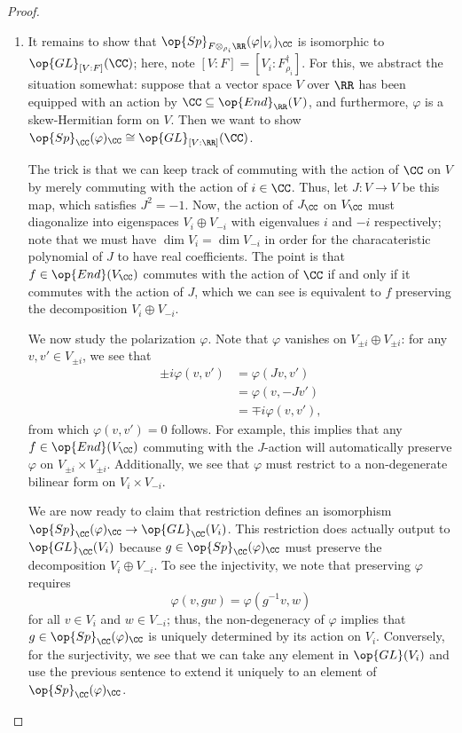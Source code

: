 \documentclass[../thesis.tex]{subfiles}
\begin{document}
\begin{proof}
\begin{enumerate}
		\item It remains to show that $\op{Sp}_{F\otimes_{\rho_i}\RR}(\varphi|_{V_i})_\CC$ is isomorphic to $\op{GL}_{[V:F]}(\CC)$; here, note $[V:F]=[V_i:F_{\rho_i}^\dagger]$. For this, we abstract the situation somewhat: suppose that a vector space $V$ over $\RR$ has been equipped with an action by $\CC\subseteq\op{End}_{\RR}(V)$, and furthermore, $\varphi$ is a skew-Hermitian form on $V$. Then we want to show $\op{Sp}_{\CC}(\varphi)_\CC\cong\op{GL}_{[V:\RR]}(\CC)$. 

		The trick is that we can keep track of commuting with the action of $\CC$ on $V$ by merely commuting with the action of $i\in\CC$. Thus, let $J\colon V\to V$ be this map, which satisfies $J^2=-1$. Now, the action of $J_\CC$ on $V_\CC$ must diagonalize into eigenspaces $V_i\oplus V_{-i}$ with eigenvalues $i$ and $-i$ respectively; note that we must have $\dim V_i=\dim V_{-i}$ in order for the characateristic polynomial of $J$ to have real coefficients. The point is that $f\in\op{End}(V_\CC)$ commutes with the action of $\CC$ if and only if it commutes with the action of $J$, which we can see is equivalent to $f$ preserving the decomposition $V_i\oplus V_{-i}$.

		We now study the polarization $\varphi$. Note that $\varphi$ vanishes on $V_{\pm i}\oplus V_{\pm i}$: for any $v,v'\in V_{\pm i}$, we see that
		\begin{align*}
			\pm i\varphi(v,v') &= \varphi(Jv,v') \\
			&= \varphi(v,-Jv') \\
			&= \mp i\varphi(v,v'),
		\end{align*}
		from which $\varphi(v,v')=0$ follows. For example, this implies that any $f\in\op{End}(V_\CC)$ commuting with the $J$-action will automatically preserve $\varphi$ on $V_{\pm i}\times V_{\pm i}$. Additionally, we see that $\varphi$ must restrict to a non-degenerate bilinear form on $V_i\times V_{-i}$.
		
		We are now ready to claim that restriction defines an isomorphism $\op{Sp}_\CC(\varphi)_\CC\to\op{GL}_\CC(V_i)$. This restriction does actually output to $\op{GL}_\CC(V_i)$ because $g\in\op{Sp}_\CC(\varphi)_\CC$ must preserve the decomposition $V_i\oplus V_{-i}$. To see the injectivity, we note that preserving $\varphi$ requires
		\[\varphi(v,gw)=\varphi\left(g^{-1}v,w\right)\]
		for all $v\in V_i$ and $w\in V_{-i}$; thus, the non-degeneracy of $\varphi$ implies that $g\in\op{Sp}_\CC(\varphi)_\CC$ is uniquely determined by its action on $V_i$. Conversely, for the surjectivity, we see that we can take any element in $\op{GL}(V_i)$ and use the previous sentence to extend it uniquely to an element of $\op{Sp}_\CC(\varphi)_\CC$.
		\qedhere
	\end{enumerate}
\end{proof}
\end{document}
